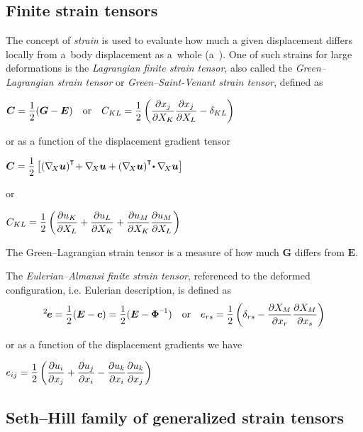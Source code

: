 \begin{otherlanguage}{russian}
{\subsection*{Finite strain tensors}

The concept of \emph{strain} is used to evaluate how much a given displacement differs locally from a~body displacement as a~whole (a~). One of such strains for large deformations is the \emph{Lagrangian finite strain tensor}, also called the \emph{Green\hbox{--}Lagrangian strain tensor} or \emph{Green\hbox{--}Saint\hbox{-\hspace{-0.2ex}}Venant strain tensor}, defined as

${\displaystyle \bm{C} = \onehalf (\bm{G} - \bm{E})
\quad {\text{or}} \quad
C_{KL} = \onehalf \left( {\frac{\partial x_{j}}{\partial X_{K}}}{\frac{\partial x_{j}}{\partial X_{L}}} - \delta_{KL} \right)}$

or as a function of the displacement gradient tensor

${\displaystyle \bm{C} = \onehalf \left[(\nabla_{\!X}\bm{u})^{\T}\! + \nabla_{\!X}\bm{u} + (\nabla_{\!X}\bm{u})^{\T}\! \dotp \nabla_{\!X}\bm{u} \right]}$

or

${\displaystyle C_{KL} = \onehalf \left({\frac{\partial u_{K}}{\partial X_{L}}} + {\frac{\partial u_{L}}{\partial X_{K}}} + {\frac{\partial u_{M}}{\partial X_{K}}}{\frac{\partial u_{M}}{\partial X_{L}}}\right)}$

The Green\hbox{--}Lagrangian strain tensor is a measure of how much $\bm{G}$ differs from $\bm{E}$.

The \emph{Eulerian\hbox{--}Almansi finite strain tensor}, referenced to the deformed configuration, i.e. Eulerian description, is defined as
\[ \displaystyle ^2\hspace{-0.2ex}\bm{e} = \onehalf (\bm{E} - \bm{c}) = \onehalf (\bm{E} - \bm{\Phi}^{\expminusone})
\quad {\text{or}} \quad
e_{rs} = \onehalf \left( \delta _{rs} - {\frac{\partial X_{M}}{\partial x_{r}}}{\frac{\partial X_{M}}{\partial x_{s}}} \right) \]

or as a function of the displacement gradients we have

${\displaystyle e_{ij} = \onehalf \left( {\frac{\partial u_{i}}{\partial x_{j}}} + {\frac{\partial u_{j}}{\partial x_{i}}} - {\frac{\partial u_{k}}{\partial x_{i}}}{\frac{\partial u_{k}}{\partial x_{j}}} \right)}$

\subsection*{Seth\hbox{--}Hill family of generalized strain tensors}

}
\end{otherlanguage}
